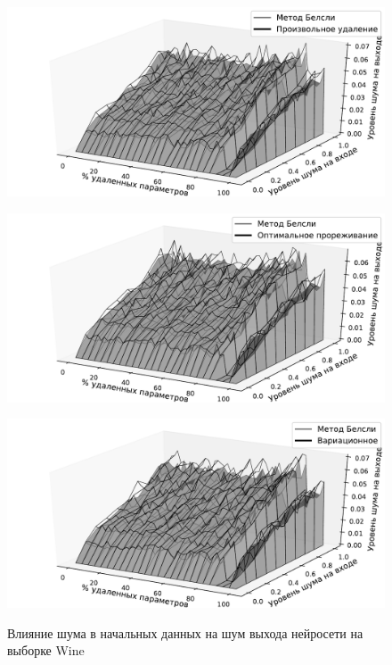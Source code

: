 \begin{figure}[h!t]\center
\begin{minipage}[t]{0.45\textwidth}
{\includegraphics[width=\textwidth]{plots/grabovoy/Wine/RandomNoise3D.pdf}}
\end{minipage}
\begin{minipage}[t]{0.45\textwidth}
{\includegraphics[width=\textwidth]{plots/grabovoy/Wine/OBDNoise3D.pdf}}
\end{minipage}
\begin{minipage}[t]{0.45\textwidth}
{\includegraphics[width=\textwidth]{plots/grabovoy/Wine/VariationalNoise3D.pdf}}
\end{minipage}
\caption{Влияние шума в начальных данных на шум выхода нейросети на выборке Wine}
\label{WineNoise}
\end{figure}

